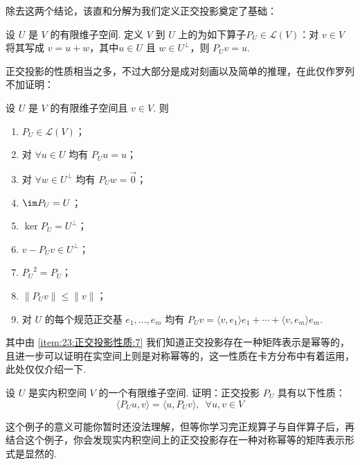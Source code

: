 除去这两个结论，该直和分解为我们定义正交投影奠定了基础：
\begin{definition}{}{}
    设 $ U $ 是 $ V $ 的有限维子空间. 定义 $ V $ 到 $ U $ 上的为如下算子$ P_U \in \mathcal{L} (V)$：对 $ v \in V $ 将其写成 $ v = u + w $，其中$ u \in U $ 且 $ w \in U^{\perp }$，则 $ P_U v = u $.
\end{definition}

正交投影的性质相当之多，不过大部分是成对刻画以及简单的推理，在此仅作罗列不加证明：

设 $ U $ 是 $ V $ 的有限维子空间且 $ v \in V$. 则
\begin{enumerate}
    \item $ P_U \in \mathcal{L} (V) $；

    \item 对 $ \forall u \in U$ 均有 $ P_U u = u $；

    \item 对 $ \forall w \in U^{\perp}$ 均有 $ P_U w = \vec{0} $；

    \item $ \im P_U = U$；

    \item $ \ker P_U = U^{\perp}$；

    \item $ v - P_U v \in U^{\perp}$；

    \item \label{item:23:正交投影性质:7}
          $ {P_U}^{2} = P_U$；

    \item $ \lVert P_U v\rVert \leqslant \lVert v \rVert $；

    \item 对 $ U $ 的每个规范正交基 $e_1, \ldots , e_m$ 均有 $ P_U v = \langle v, e_1 \rangle e_1 + \cdots + \langle v, e_m \rangle e_m$.
\end{enumerate}
其中由 \ref*{item:23:正交投影性质:7} 我们知道正交投影存在一种矩阵表示是幂等的，且进一步可以证明在实空间上则是对称幂等的，这一性质在卡方分布中有着运用，此处仅仅介绍一下.

\begin{example}{}{}
    设 $ U $ 是实内积空间 $ V $ 的一个有限维子空间. 证明：正交投影 $ P_U $ 具有以下性质：
    \[\langle P_U u, v\rangle = \langle u, P_U v\rangle, \enspace \forall u, v \in V \]
\end{example}

这个例子的意义可能你暂时还没法理解，但等你学习完正规算子与自伴算子后，再结合这个例子，你会发现实内积空间上的正交投影存在一种对称幂等的矩阵表示形式是显然的.

